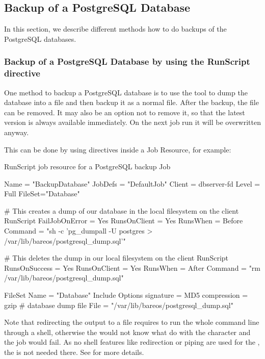 \subsection{Backup of a PostgreSQL Database}
\label{backup-postgresql}

In this section, we describe different methods how to do backups of the PostgreSQL databases.


\subsubsection{Backup of a PostgreSQL Database by using the RunScript directive}

One method to backup a PostgreSQL database is to use the  tool to dump the database
into a file and then backup it as a normal file. After the backup, the file can be
removed. It may also be an option not to remove it, so that the latest version is
always available immediately. On the next job run it will be overwritten anyway.

This can be done by using  directives inside a
Job Resource, for example:

\begin{bconfig}{RunScript job resource for a PostgreSQL backup}
Job {
  Name = "BackupDatabase"
  JobDefs = "DefaultJob"
  Client = dbserver-fd
  Level = Full
  FileSet="Database"

  # This creates a dump of our database in the local filesystem on the client
  RunScript {
    FailJobOnError = Yes
    RunsOnClient = Yes
    RunsWhen = Before
    Command = "sh -c 'pg_dumpall -U postgres > /var/lib/bareos/postgresql_dump.sql'"
  }

  # This deletes the dump in our local filesystem on the client
  RunScript {
    RunsOnSuccess = Yes
    RunsOnClient = Yes
    RunsWhen = After
    Command = "rm /var/lib/bareos/postgresql_dump.sql"
  }
}

FileSet {
  Name = "Database"
  Include {
    Options {
      signature = MD5
      compression = gzip
    }
    # database dump file
    File = "/var/lib/bareos/postgresql_dump.sql"
  }
}
\end{bconfig}

Note that redirecting the  output to a file requires
to run the whole command line through a shell, otherwise the 
would not know what do with the \command{>} character and the job would fail.
As no shell features like redirection or piping are used for the ,
the  is not needed there.
See  for more details.

